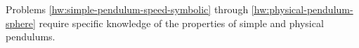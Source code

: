 Problems \ref{hw:simple-pendulum-speed-symbolic} through
\ref{hw:physical-pendulum-sphere} require specific knowledge of the
properties of simple and physical pendulums.
